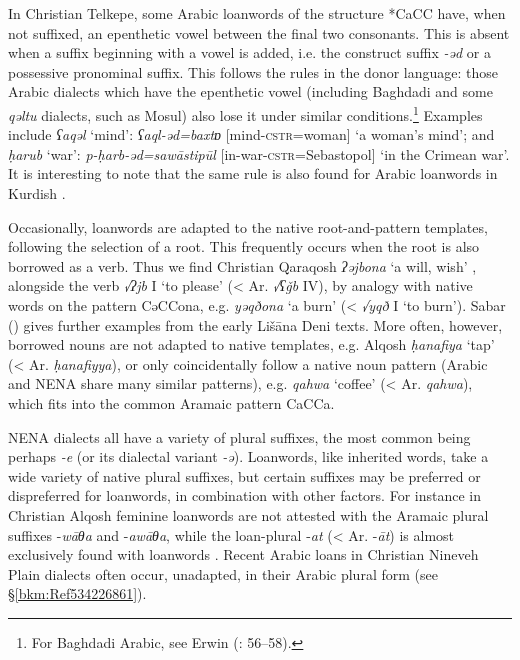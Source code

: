 \documentclass[output=paper]{langsci/langscibook}
\begin{document}
In Christian Telkepe, some Arabic loanwords of the structure *CaCC have, when not suffixed, an epenthetic vowel between the final two consonants. This is absent when a suffix beginning with a vowel is added, i.e. the construct suffix \textit{{}-əd} or a possessive pronominal suffix. This follows the rules in the donor language: those Arabic dialects which have the epenthetic vowel (including Baghdadi and some \textit{qəltu} dialects, such as Mosul) also lose it under similar conditions.\footnote{For Baghdadi Arabic, see Erwin (\citeyear{Erwin1963}: 56–58).} Examples include \textit{ʕaqəl} ‘mind’: \textit{ʕaql-əd=baxtɒ} [mind-\textsc{cstr}=woman] ‘a woman's mind'; and \textit{ḥarub} ‘war’: \textit{p\nobreakdash-ḥarb\nobreakdash-əd=sawāstipūl} [in-war-\textsc{cstr}=Sebastopol] ‘in the Crimean war’. It is interesting to note that the same rule is also found for Arabic loanwords in Kurdish \citep[5]{Thackston2006}.

Occasionally, loanwords are adapted to the native root-and-pattern templates, following the selection of a root. This frequently occurs when the root is also borrowed as a verb. Thus we find Christian Qaraqosh \textit{ʔəjbona} ‘a will, wish’ \citep[517]{Khan2002}, alongside the verb \textit{√ʔjb} I ‘to please’ (< Ar. \textit{√ʕǧb} IV), by analogy with native words on the pattern CəCCona, e.g. \textit{yəqðona} ‘a burn’ (< \textit{√yqð} I ‘to burn’). Sabar (\citeyear[205]{Sabar1984}) gives further examples from the early Lišāna Deni texts. More often, however, borrowed nouns are not adapted to native templates, e.g. Alqosh \textit{ḥanafiya} ‘tap’ (< Ar. \textit{ḥanafiyya}), or only coincidentally follow a native noun pattern (Arabic and NENA share many similar patterns), e.g. \textit{qahwa} ‘coffee’ (< Ar. \textit{qahwa}), which fits into the common Aramaic pattern CaCCa.

NENA dialects all have a variety of plural suffixes, the most common being perhaps \textit{\nobreakdash-e} (or its dialectal variant \textit{\nobreakdash-ə}). Loanwords, like inherited words, take a wide variety of native plural suffixes, but certain suffixes may be preferred or dispreferred for loanwords, in combination with other factors. For instance in Christian Alqosh feminine loanwords are not attested with the Aramaic plural suffixes \nobreakdash-\textit{wāθa} and \nobreakdash-\textit{awāθa}, while the loan-plural \nobreakdash-\textit{at} (< Ar. \nobreakdash-\textit{āt}) is almost exclusively found with loanwords \citep[347]{Coghill2005}. Recent Arabic loans in Christian Nineveh Plain dialects often occur, unadapted, in their Arabic plural form (see §\ref{bkm:Ref534226861}).
\end{document}
